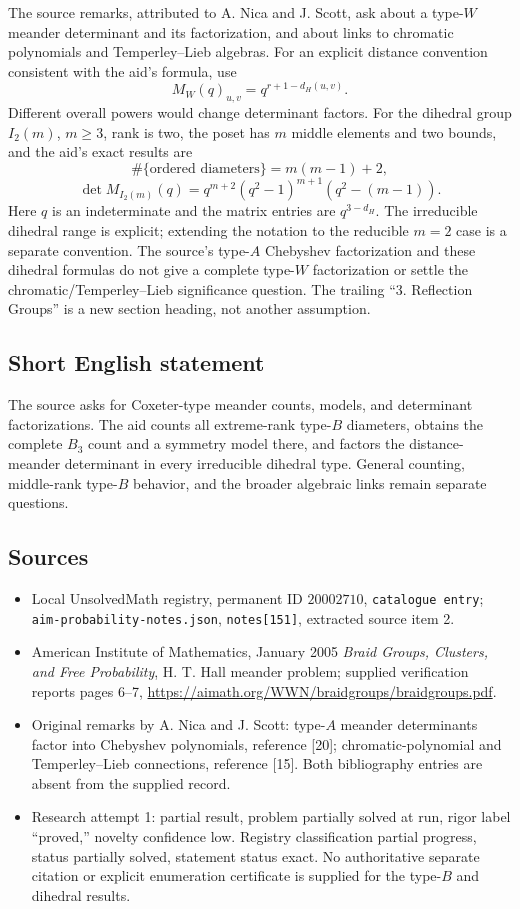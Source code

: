 \documentclass[11pt]{article}
\begin{document}
The source remarks, attributed to A. Nica and J. Scott, ask about a type-$W$ meander determinant and its factorization, and about links to chromatic polynomials and Temperley--Lieb algebras. For an explicit distance convention consistent with the aid's formula, use
\[
M_W(q)_{u,v}=q^{r+1-d_H(u,v)}.
\]
Different overall powers would change determinant factors. For the dihedral group $I_2(m)$, $m\geq3$, rank is two, the poset has $m$ middle elements and two bounds, and the aid's exact results are
\[
\#\{\text{ordered diameters}\}=m(m-1)+2,
\]
\[
\det M_{I_2(m)}(q)
=q^{m+2}(q^2-1)^{m+1}(q^2-(m-1)).
\]
Here $q$ is an indeterminate and the matrix entries are $q^{3-d_H}$. The irreducible dihedral range is explicit; extending the notation to the reducible $m=2$ case is a separate convention. The source's type-$A$ Chebyshev factorization and these dihedral formulas do not give a complete type-$W$ factorization or settle the chromatic/Temperley--Lieb significance question. The trailing ``3. Reflection Groups'' is a new section heading, not another assumption.
\subsection{Short English statement}
The source asks for Coxeter-type meander counts, models, and determinant factorizations. The aid counts all extreme-rank type-$B$ diameters, obtains the complete $B_3$ count and a symmetry model there, and factors the distance-meander determinant in every irreducible dihedral type. General counting, middle-rank type-$B$ behavior, and the broader algebraic links remain separate questions.
\subsection{Sources}
\begin{itemize}
\item Local UnsolvedMath registry, permanent ID $20002710$, \texttt{catalogue entry}; \texttt{aim-probability-notes.json}, \texttt{notes[151]}, extracted source item 2.
\item American Institute of Mathematics, January 2005 \emph{Braid Groups, Clusters, and Free Probability}, H. T. Hall meander problem; supplied verification reports pages 6--7, \url{https://aimath.org/WWN/braidgroups/braidgroups.pdf}.
\item Original remarks by A. Nica and J. Scott: type-$A$ meander determinants factor into Chebyshev polynomials, reference [20]; chromatic-polynomial and Temperley--Lieb connections, reference [15]. Both bibliography entries are absent from the supplied record.
\item Research attempt 1: partial result, problem partially solved at run, rigor label ``proved,'' novelty confidence low. Registry classification partial progress, status partially solved, statement status exact. No authoritative separate citation or explicit enumeration certificate is supplied for the type-$B$ and dihedral results.
\end{itemize}
\end{document}
